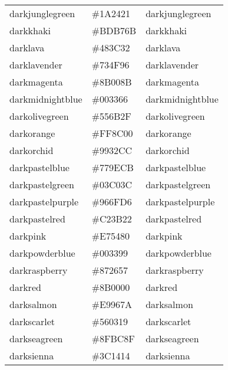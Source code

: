 \documentclass[
]{article}
\begin{document}
\begin{longtable}[]{@{}lll@{}}
darkjunglegreen & \colorbox[rgb]{0.1,0.14,0.13}{\#1A2421} &
\textcolor[rgb]{0.1,0.14,0.13}{darkjunglegreen       }\tabularnewline
darkkhaki & \colorbox[rgb]{0.74,0.72,0.42}{\#BDB76B} &
\textcolor[rgb]{0.74,0.72,0.42}{darkkhaki             }\tabularnewline
darklava & \colorbox[rgb]{0.28,0.24,0.2}{\#483C32} &
\textcolor[rgb]{0.28,0.24,0.2}{darklava              }\tabularnewline
darklavender & \colorbox[rgb]{0.45,0.31,0.59}{\#734F96} &
\textcolor[rgb]{0.45,0.31,0.59}{darklavender          }\tabularnewline
darkmagenta & \colorbox[rgb]{0.55,0.0,0.55}{\#8B008B} &
\textcolor[rgb]{0.55,0.0,0.55}{darkmagenta           }\tabularnewline
darkmidnightblue & \colorbox[rgb]{0.0,0.2,0.4}{\#003366} &
\textcolor[rgb]{0.0,0.2,0.4}{darkmidnightblue      }\tabularnewline
darkolivegreen & \colorbox[rgb]{0.33,0.42,0.18}{\#556B2F} &
\textcolor[rgb]{0.33,0.42,0.18}{darkolivegreen        }\tabularnewline
darkorange & \colorbox[rgb]{1.0,0.55,0.0}{\#FF8C00} &
\textcolor[rgb]{1.0,0.55,0.0}{darkorange            }\tabularnewline
darkorchid & \colorbox[rgb]{0.6,0.2,0.8}{\#9932CC} &
\textcolor[rgb]{0.6,0.2,0.8}{darkorchid            }\tabularnewline
darkpastelblue & \colorbox[rgb]{0.47,0.62,0.8}{\#779ECB} &
\textcolor[rgb]{0.47,0.62,0.8}{darkpastelblue        }\tabularnewline
darkpastelgreen & \colorbox[rgb]{0.01,0.75,0.24}{\#03C03C} &
\textcolor[rgb]{0.01,0.75,0.24}{darkpastelgreen       }\tabularnewline
darkpastelpurple & \colorbox[rgb]{0.59,0.44,0.84}{\#966FD6} &
\textcolor[rgb]{0.59,0.44,0.84}{darkpastelpurple      }\tabularnewline
darkpastelred & \colorbox[rgb]{0.76,0.23,0.13}{\#C23B22} &
\textcolor[rgb]{0.76,0.23,0.13}{darkpastelred         }\tabularnewline
darkpink & \colorbox[rgb]{0.91,0.33,0.5}{\#E75480} &
\textcolor[rgb]{0.91,0.33,0.5}{darkpink              }\tabularnewline
darkpowderblue & \colorbox[rgb]{0.0,0.2,0.6}{\#003399} &
\textcolor[rgb]{0.0,0.2,0.6}{darkpowderblue        }\tabularnewline
darkraspberry & \colorbox[rgb]{0.53,0.15,0.34}{\#872657} &
\textcolor[rgb]{0.53,0.15,0.34}{darkraspberry         }\tabularnewline
darkred & \colorbox[rgb]{0.55,0.0,0.0}{\#8B0000} &
\textcolor[rgb]{0.55,0.0,0.0}{darkred               }\tabularnewline
darksalmon & \colorbox[rgb]{0.91,0.59,0.48}{\#E9967A} &
\textcolor[rgb]{0.91,0.59,0.48}{darksalmon            }\tabularnewline
darkscarlet & \colorbox[rgb]{0.34,0.01,0.1}{\#560319} &
\textcolor[rgb]{0.34,0.01,0.1}{darkscarlet           }\tabularnewline
darkseagreen & \colorbox[rgb]{0.56,0.74,0.56}{\#8FBC8F} &
\textcolor[rgb]{0.56,0.74,0.56}{darkseagreen          }\tabularnewline
darksienna & \colorbox[rgb]{0.24,0.08,0.08}{\#3C1414} &
\textcolor[rgb]{0.24,0.08,0.08}{darksienna            }\tabularnewline

\end{longtable}
\end{document}
